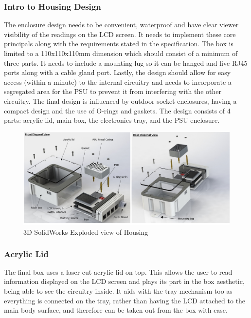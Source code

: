 \documentclass[9pt, technote, a4paper, nofonttune]{IEEEphot}
\begin{document}
        \subsubsection{Intro to Housing Design}
        \hspace{0.5cm} The enclosure design needs to be convenient, waterproof and have clear viewer visibility of the readings on the LCD screen. It needs to implement these core principals along with the requirements stated in the specification. The box is limited to a 110x110x110mm dimension which should consist of a minimum of three parts. It needs to include a mounting lug so it can be hanged and five RJ45 ports along with a cable gland port. Lastly, the design should allow for easy access (within a minute) to the internal circuitry and needs to incorporate a segregated area for the PSU to prevent it from interfering with the other circuitry. The final design is influenced by outdoor socket enclosures, having a compact design and the use of O-rings and gaskets. The design consists of 4 parts: acrylic lid, main box, the electronics tray, and the PSU enclosure.
        \\
        \begin{figure}[h]
        \centering
        \includegraphics[width=30pc]{D5/Enclosure3DModel.png}
        \caption{3D SolidWorks Exploded view of Housing}
        \label{fig:x Enclosure}
        \end{figure}
        
        \subsubsection{Acrylic Lid}
        \hspace{0.5cm}The final box uses a laser cut acrylic lid on top. This allows the user to read information displayed on the LCD screen and plays its part in the box aesthetic, being able to see the circuitry inside. It aids with the tray mechanism too as everything is connected on the tray, rather than having the LCD attached to the main body surface, and therefore can be taken out from the box with ease.
\end{document}
